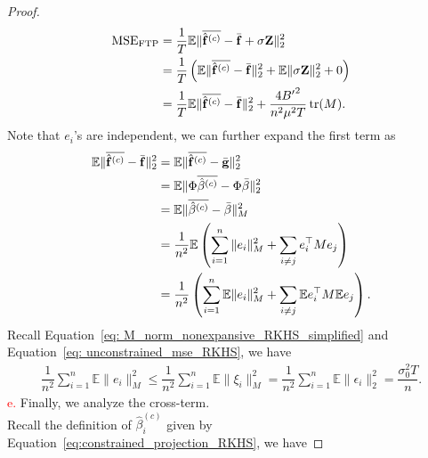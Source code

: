 \begin{proof}
\begin{align}
\mathrm{MSE}_{\mathrm{FTP}}
&= 
\dfrac{1}{T} \mathbb{E} 
\|\overline{\hat{\mathbf{f}}^{(c)}} - \bar{\mathbf{f}} + \sigma \mathbf{Z}\|_2^2\nonumber\\
&= 
\dfrac{1}{T} 
\Bra{\mathbb{E} 
\|\overline{\hat{\mathbf{f}}^{(c)}} - \bar{\mathbf{f}}\|_2^2 
+ 
\mathbb{E} \|\sigma \mathbf{Z}\|_2^2 + 0}
\nonumber\\
&= 
\dfrac{1}{T} 
\mathbb{E} 
\|\overline{\hat{\mathbf{f}}^{(c)}} - \bar{\mathbf{f}}\|_2^2 
+ 
\dfrac{4{B'}^2}{n^2\mu^2 T} \operatorname{tr}(M).
\label{eq: expanded MSE}
\end{align}
Note that $e_i$'s are independent, we can further expand the first term as
\begin{equation}
    \begin{aligned}
        \mathbb{E} 
        \|\overline{\hat{\mathbf{f}}^{(c)}} - \bar{\mathbf{f}}\|_2^2 
        &=
        \mathbb{E} 
        \|\overline{\hat{\mathbf{f}}^{(c)}} - \bar{\mathbf{g}}\|_2^2\\
        &=
        \mathbb{E} 
        \|\Phi \overline{\hat{\beta}^{(c)}} - \Phi\bar{\beta}\|_2^2\\
        &=
        \mathbb{E} 
        \|\overline{\hat{\beta}^{(c)}} - \bar{\beta}\|_{M}^2\\
        &=
        \dfrac{1}{n^2} \mathbb E \Bra{
        \sum_{i=1}^n \|e_i\|_M^2 + \sum_{i\ne j} e_i^\top  M e_j}\\
        &=
        \dfrac{1}{n^2} \Bra{
        \sum_{i=1}^n \mathbb E \|e_i\|_M^2
        + \sum_{i\ne j} \mathbb E e_i^\top M \mathbb E e_j
        }.
    \end{aligned}
    \label{eq: expand bias and clipping}
\end{equation}
Recall Equation~\eqref{eq: M_norm_nonexpansive_RKHS_simplified} and Equation~\eqref{eq: unconstrained_mse_RKHS}, we have
\begin{equation}
    \begin{aligned}
        \dfrac{1}{n^2} \sum_{i=1}^n \mathbb E \|e_i\|_M^2 
        \leq
        \dfrac{1}{n^2} \sum_{i=1}^n \mathbb E \|\xi_i\|_M^2
        =
        \dfrac{1}{n^2} \sum_{i=1}^n \mathbb E \|\epsilon_i\|_2^2
        =
        \dfrac{\sigma_0^2T}{n}.
    \end{aligned}
\label{eq: noise term_RKHS}
\end{equation}
\textcolor{red}{e.} 
Finally, we analyze the cross-term.\\
Recall the definition of $\hat{\beta}_i^{(c)}$ given by Equation~\eqref{eq:constrained_projection_RKHS}, we have

\end{proof}
